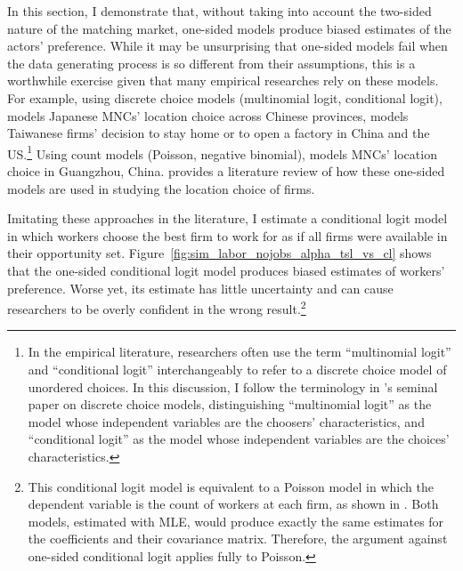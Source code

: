In this section, I demonstrate that, without taking into account the two-sided
nature of the matching market, one-sided models produce biased estimates of the
actors' preference. While it may be unsurprising that one-sided models fail when
the data generating process is so different from their assumptions, this is a
worthwhile exercise given that many empirical researches rely on these models.
For example, using discrete choice models (multinomial logit, conditional
logit), \citet{Cheng2006} models Japanese MNCs' location choice across Chinese
provinces, \citet{Aw2008} models Taiwanese firms' decision to stay home or to
open a factory in China and the US.\footnote{In the empirical literature,
  researchers often use the term ``multinomial logit'' and ``conditional logit''
  interchangeably to refer to a discrete choice model of unordered choices. In
  this discussion, I follow the terminology in \citet{McFadden1974}'s seminal
  paper on discrete choice models, distinguishing ``multinomial logit'' as the
  model whose independent variables are the choosers' characteristics, and
  ``conditional logit'' as the model whose independent variables are the
  choices' characteristics.} Using count models (Poisson, negative binomial),
\citet{Wu1999} models MNCs' location choice in Guangzhou, China.
\citet{Arauzo-Carod2010} provides a literature review of how these one-sided
models are used in studying the location choice of firms.

Imitating these approaches in the literature, I estimate a conditional logit
model in which workers choose the best firm to work for as if all firms were
available in their opportunity set.
Figure~\ref{fig:sim_labor_nojobs_alpha_tsl_vs_cl} shows that the one-sided
conditional logit model produces biased estimates of workers' preference. Worse
yet, its estimate has little uncertainty and can cause researchers to be overly
confident in the wrong result.\footnote{This conditional logit model is
  equivalent to a Poisson model in which the dependent variable is the count of
  workers at each firm, as shown in \citet{Guimaraes2003}. Both models,
  estimated with MLE, would produce exactly the same estimates for the
  coefficients and their covariance matrix. Therefore, the argument against
  one-sided conditional logit applies fully to Poisson.}

